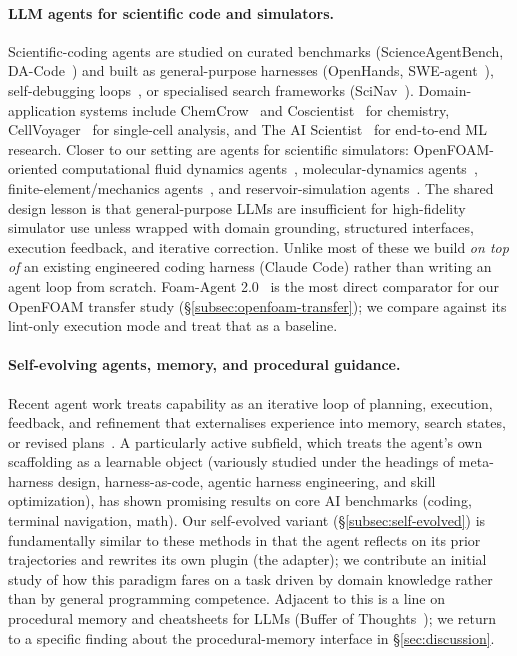 \documentclass{article}
\begin{document}
\paragraph{LLM agents for scientific code and simulators.}
Scientific-coding agents are studied on curated benchmarks (ScienceAgentBench, DA-Code~\cite{chen2024scienceagentbench,huang2024dacode}) and built as general-purpose harnesses (OpenHands, SWE-agent~\cite{wang2024openhands,yang2024sweagent}), self-debugging loops~\cite{chen2024selfdebug}, or specialised search frameworks (SciNav~\cite{zhang2026scinav}). Domain-application systems include ChemCrow~\cite{bran2024chemcrow} and Coscientist~\cite{boiko2023coscientist} for chemistry, CellVoyager~\cite{alber2025cellvoyager} for single-cell analysis, and The AI Scientist~\cite{lu2024aiscientist,yamada2025ai} for end-to-end ML research. Closer to our setting are agents for scientific simulators: OpenFOAM-oriented computational fluid dynamics agents~\cite{chen2024metaopenfoam,pandey2025openfoamgpt,foamagent2025}, molecular-dynamics agents~\cite{kim2024mdagents,shi2026mdagent2,guilbert2025dynamate,zhao2026polyjarvis}, finite-element/mechanics agents~\cite{zhan2025mooseagent,ni2024mechagents}, and reservoir-simulation agents~\cite{moyner2026jutulgpt}. The shared design lesson is that general-purpose LLMs are insufficient for high-fidelity simulator use unless wrapped with domain grounding, structured interfaces, execution feedback, and iterative correction. Unlike most of these we build \emph{on top of} an existing engineered coding harness (Claude Code) rather than writing an agent loop from scratch. Foam-Agent 2.0~\cite{foamagent2025} is the most direct comparator for our OpenFOAM transfer study (\S\ref{subsec:openfoam-transfer}); we compare against its lint-only execution mode and treat that as a baseline.

\paragraph{Self-evolving agents, memory, and procedural guidance.}
Recent agent work treats capability as an iterative loop of planning, execution, feedback, and refinement that externalises experience into memory, search states, or revised plans~\citep{bran2024chemcrow,boiko2023coscientist,alber2025cellvoyager,lu2024aiscientist,zhang2026scinav,li2026agentflow,tang2026eigenagent,narayanan2024aviary}. A particularly active subfield, which treats the agent's own scaffolding as a learnable object (variously studied under the headings of meta-harness design, harness-as-code, agentic harness engineering, and skill optimization), has shown promising results on core AI benchmarks (coding, terminal navigation, math). Our self-evolved variant (\S\ref{subsec:self-evolved}) is fundamentally similar to these methods in that the agent reflects on its prior trajectories and rewrites its own plugin (the adapter); we contribute an initial study of how this paradigm fares on a task driven by domain knowledge rather than by general programming competence. Adjacent to this is a line on procedural memory and cheatsheets for LLMs (Buffer of Thoughts~\cite{yang2024bot}); we return to a specific finding about the procedural-memory interface in \S\ref{sec:discussion}.
\end{document}
